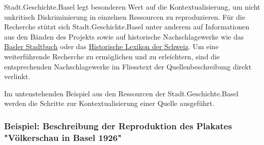 \documentclass[
  nswissgerman,
  letterpaper,
  DIV=11,
  numbers=noendperiod]{scrartcl}
\begin{document}
\begin{tcolorbox}[enhanced jigsaw, arc=.35mm, bottomrule=.15mm, bottomtitle=1mm, breakable, colback=white, colbacktitle=quarto-callout-tip-color!10!white, colframe=quarto-callout-tip-color-frame, coltitle=black, left=2mm, leftrule=.75mm, opacityback=0, opacitybacktitle=0.6, rightrule=.15mm, title=\textcolor{quarto-callout-tip-color}{\faLightbulb}\hspace{0.5em}{Erfahrungen der Stadt.Geschichte.Basel}, titlerule=0mm, toprule=.15mm, toptitle=1mm]

Stadt.Geschichte.Basel legt besonderen Wert auf die Kontextualisierung,
um nicht unkritisch Diskriminierung in einzelnen Ressourcen zu
reproduzieren. Für die Recherche stützt sich Stadt.Geschichte.Basel
unter anderem auf Informationen aus den Bänden des Projekts sowie auf
historische Nachschlagewerke wie das
\href{https://www.baslerstadtbuch.ch/home.html}{Basler Stadtbuch} oder
das \href{https://hls-dhs-dss.ch/}{Historische Lexikon der Schweiz}. Um
eine weiterführende Recherche zu ermöglichen und zu erleichtern, sind
die entsprechenden Nachschlagewerke im Fliesstext der
Quellenbeschreibung direkt verlinkt.

\end{tcolorbox}

Im untenstehenden Beispiel aus den Ressourcen der Stadt.Geschichte.Basel
werden die Schritte zur Kontextualisierung einer Quelle ausgeführt.

\subsubsection{Beispiel: Beschreibung der Reproduktion des Plakates
"Völkerschau in Basel
1926"}\label{beispiel-beschreibung-der-reproduktion-des-plakates-vuxf6lkerschau-in-basel-1926}
\end{document}
